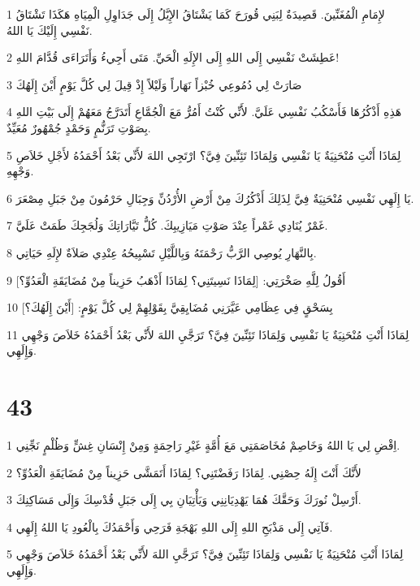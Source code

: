 \par 1 لإِمَامِ الْمُغَنِّينَ. قَصِيدَةٌ لِبَنِي قُورَحَ كَمَا يَشْتَاقُ الإِيَّلُ إِلَى جَدَاوِلِ الْمِيَاهِ هَكَذَا تَشْتَاقُ نَفْسِي إِلَيْكَ يَا اللهُ.
\par 2 عَطِشَتْ نَفْسِي إِلَى اللهِ إِلَى الإِلَهِ الْحَيِّ. مَتَى أَجِيءُ وَأَتَرَاءَى قُدَّامَ اللهِ!
\par 3 صَارَتْ لِي دُمُوعِي خُبْزاً نَهَاراً وَلَيْلاً إِذْ قِيلَ لِي كُلَّ يَوْمٍ أَيْنَ إِلَهُكَ
\par 4 هَذِهِ أَذْكُرُهَا فَأَسْكُبُ نَفْسِي عَلَيَّ. لأَنِّي كُنْتُ أَمُرُّ مَعَ الْجُمَّاعِ أَتَدَرَّجُ مَعَهُمْ إِلَى بَيْتِ اللهِ بِصَوْتِ تَرَنُّمٍ وَحَمْدٍ جُمْهُورٌ مُعَيِّدٌ.
\par 5 لِمَاذَا أَنْتِ مُنْحَنِيَةٌ يَا نَفْسِي وَلِمَاذَا تَئِنِّينَ فِيَّ؟ ارْتَجِي اللهَ لأَنِّي بَعْدُ أَحْمَدُهُ لأَجْلِ خَلاَصِ وَجْهِهِ.
\par 6 يَا إِلَهِي نَفْسِي مُنْحَنِيَةٌ فِيَّ لِذَلِكَ أَذْكُرُكَ مِنْ أَرْضِ الأُرْدُنِّ وَجِبَالِ حَرْمُونَ مِنْ جَبَلِ مِصْعَرَ.
\par 7 غَمْرٌ يُنَادِي غَمْراً عِنْدَ صَوْتِ مَيَازِيبِكَ. كُلُّ تَيَّارَاتِكَ وَلُجَجِكَ طَمَتْ عَلَيَّ.
\par 8 بِالنَّهَارِ يُوصِي الرَّبُّ رَحْمَتَهُ وَبِاللَّيْلِ تَسْبِيحُهُ عِنْدِي صَلاَةٌ لإِلَهِ حَيَاتِي.
\par 9 أَقُولُ لِلَّهِ صَخْرَتِي: [لِمَاذَا نَسِيتَنِي؟ لِمَاذَا أَذْهَبُ حَزِيناً مِنْ مُضَايَقَةِ الْعَدُوِّ؟]
\par 10 بِسَحْقٍ فِي عِظَامِي عَيَّرَنِي مُضَايِقِيَّ بِقَوْلِهِمْ لِي كُلَّ يَوْمٍ: [أَيْنَ إِلَهُكَ؟]
\par 11 لِمَاذَا أَنْتِ مُنْحَنِيَةٌ يَا نَفْسِي وَلِمَاذَا تَئِنِّينَ فِيَّ؟ تَرَجَّيِ اللهَ لأَنِّي بَعْدُ أَحْمَدُهُ خَلاَصَ وَجْهِي وَإِلَهِي.

\chapter{43}

\par 1 اِقْضِ لِي يَا اللهُ وَخَاصِمْ مُخَاصَمَتِي مَعَ أُمَّةٍ غَيْرِ رَاحِمَةٍ وَمِنْ إِنْسَانِ غِشٍّ وَظُلْمٍ نَجِّنِي.
\par 2 لأَنَّكَ أَنْتَ إِلَهُ حِصْنِي. لِمَاذَا رَفَضْتَنِي؟ لِمَاذَا أَتَمَشَّى حَزِيناً مِنْ مُضَايَقَةِ الْعَدُوِّ؟
\par 3 أَرْسِلْ نُورَكَ وَحَقَّكَ هُمَا يَهْدِيَانِنِي وَيَأْتِيَانِ بِي إِلَى جَبَلِ قُدْسِكَ وَإِلَى مَسَاكِنِكَ.
\par 4 فَآتِي إِلَى مَذْبَحِ اللهِ إِلَى اللهِ بَهْجَةِ فَرَحِي وَأَحْمَدُكَ بِالْعُودِ يَا اللهُ إِلَهِي.
\par 5 لِمَاذَا أَنْتِ مُنْحَنِيَةٌ يَا نَفْسِي وَلِمَاذَا تَئِنِّينَ فِيَّ؟ تَرَجَّيِ اللهَ لأَنِّي بَعْدُ أَحْمَدُهُ خَلاَصَ وَجْهِي وَإِلَهِي.

